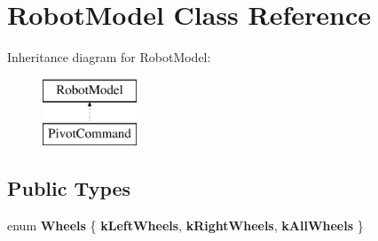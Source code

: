 \hypertarget{class_robot_model}{}\section{Robot\+Model Class Reference}
\label{class_robot_model}
Inheritance diagram for Robot\+Model\+:\begin{figure}[H]
\begin{center}
\leavevmode
\includegraphics[height=2.000000cm]{class_robot_model}
\end{center}
\end{figure}
\subsection*{Public Types}
\begin{DoxyCompactItemize}
\item 
\mbox{\label{class_robot_model_a35905ffde364a186d02ec199857ce170}} 
enum {\bfseries Wheels} \{ {\bfseries k\+Left\+Wheels}, 
{\bfseries k\+Right\+Wheels}, 
{\bfseries k\+All\+Wheels}
 \}
\end{DoxyCompactItemize}
